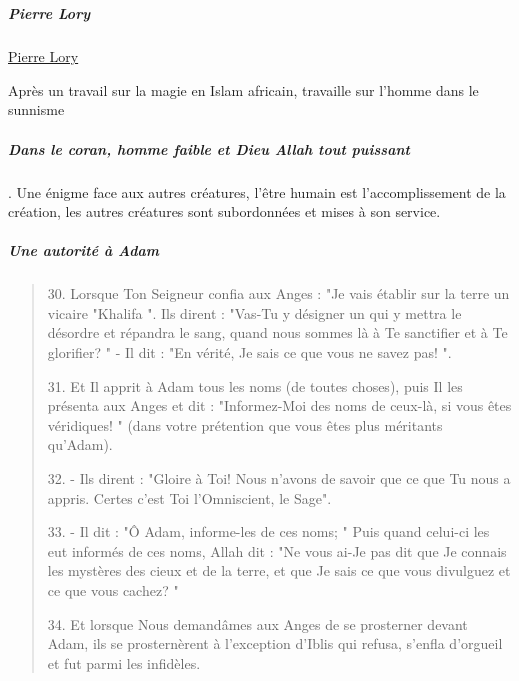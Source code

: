 \chapter{}


\paragraph{Pierre Lory}
\href{https://fr.wikipedia.org/wiki/Pierre_Lory}{Pierre Lory}

Après un travail sur la magie en Islam africain, travaille sur l'homme dans le sunnisme 

\paragraph{Dans le coran, homme faible et Dieu Allah tout puissant}. Une énigme face aux autres créatures, l'être humain est l'accomplissement de la création, les autres créatures sont subordonnées et mises à son service.

\paragraph{Une autorité à Adam}

\begin{quote}
    30. Lorsque Ton Seigneur confia aux Anges : "Je vais établir sur la terre un vicaire "Khalifa ". Ils dirent : "Vas-Tu y désigner un qui y mettra le désordre et répandra le sang, quand nous sommes là à Te sanctifier et à Te glorifier? " - Il dit : "En vérité, Je sais ce que vous ne savez pas! ".

31. Et Il apprit à Adam tous les noms (de toutes choses), puis Il les présenta aux Anges et dit : "Informez-Moi des noms de ceux-là, si vous êtes véridiques! " (dans votre prétention que vous êtes plus méritants qu'Adam).

32. - Ils dirent : "Gloire à Toi! Nous n'avons de savoir que ce que Tu nous a appris. Certes c'est Toi l'Omniscient, le Sage".

33. - Il dit : "Ô Adam, informe-les de ces noms; " Puis quand celui-ci les eut informés de ces noms, Allah dit : "Ne vous ai-Je pas dit que Je connais les mystères des cieux et de la terre, et que Je sais ce que vous divulguez et ce que vous cachez? "

34. Et lorsque Nous demandâmes aux Anges de se prosterner devant Adam, ils se prosternèrent à l'exception d'Iblis qui refusa, s'enfla d'orgueil et fut parmi les infidèles.

\end{quote}

